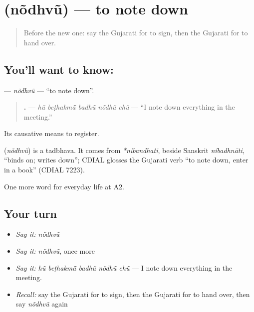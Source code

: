 \section[\texorpdfstring{\gu{નોંધવું} (nõdhvũ)}{નોંધવું (nõdhvũ)}]{ (nõdhvũ) — to note down}

\label{lesson:GU-C248-nodhvu}



\begin{quote}
Before the new one: say the Gujarati for to sign, then the Gujarati for to hand over.
\end{quote}

\subsection*{You'll want to know: }
\textbf{} — \emph{nõdhvũ} — \textquotedblleft{}to note down\textquotedblright{}.

\begin{quote}
\textbf{    .} — \emph{hũ beṭhakmā̃ badhũ nõdhũ chũ} — \textquotedblleft{}I note down everything in the meeting.\textquotedblright{}
\end{quote}

Its causative \textbf{} means to register.

\begin{cousinweb}
\textbf{} (\emph{nõdhvũ}) is a tadbhava. It comes from \emph{*nibandhati}, beside Sanskrit \emph{níbadhnāti}, \textquotedblleft{}binds on; writes down\textquotedblright{}; CDIAL glosses the Gujarati verb \textquotedblleft{}to note down, enter in a book\textquotedblright{} (CDIAL 7223).
\end{cousinweb}

\begin{grammarlens}[title={What you've built}]
One more word for everyday life at A2.
\end{grammarlens}

\subsection*{Your turn}
\begin{itemize}
\raggedright
  \item \emph{Say it:} \emph{nõdhvũ}
  \item \emph{Say it:} \emph{nõdhvũ}, once more
  \item \emph{Say it:} \emph{hũ beṭhakmā̃ badhũ nõdhũ chũ} — I note down everything in the meeting.
  \item \emph{Recall:} say the Gujarati for to sign, then the Gujarati for to hand over, then say \emph{nõdhvũ} again
\end{itemize}

